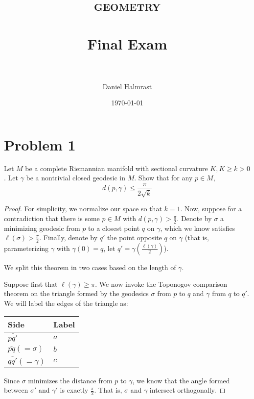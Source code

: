 \documentclass[fontsize=11pt]{scrartcl} %
\title{	
\normalfont \normalsize 
\textsc{geometry} \\ [25pt] %
\horrule{0.5pt} \\[0.4cm] %
\huge Final Exam \\ %
\horrule{2pt} \\[0.5cm] %
}
\author{Daniel Halmrast} %
\date{\normalsize\today} %
\numberwithin{equation}{section} %
\numberwithin{figure}{section} %
\numberwithin{table}{section} %
\begin{document}
\maketitle %

\section*{Problem 1}
Let $M$ be a complete Riemannian manifold with sectional curvature $K, K\geq
k>0$. Let $\gamma$ be a nontrivial closed geodesic in $M$. Show that for any
$p\in M$,
\[
    d(p,\gamma)\leq \frac{\pi}{2\sqrt{k}}
\]

\begin{proof}
    For simplicity, we normalize our space so that $k=1$. Now, suppose for a
    contradiction that there is some $p\in M$ with
    $d(p,\gamma)>\frac{\pi}{2}$. Denote by $\sigma$ a minimizing geodesic from
    $p$ to a closest point $q$ on $\gamma$, which we know satisfies
    $\ell(\sigma)>\frac{\pi}{2}$. Finally, denote by $q'$ the point opposite $q$
    on $\gamma$ (that is, parameterizing $\gamma$ with $\gamma(0)=q$, let $q' =
    \gamma(\frac{\ell(\gamma)}{2})$).

    We split this theorem in two cases based on the length of $\gamma$.

    Suppose first that $\ell(\gamma)\geq \pi$. We now invoke the Toponogov
    comparison theorem on the triangle formed by the geodesics $\sigma$ from $p$
    to $q$ and $\gamma$ from $q$ to $q'$. We will label the edges of the
    triangle as:
    \begin{center}
        \begin{tabular}{l|l}
            Side & Label\\
            \hline
            $\overline{p q'}$ & $a$\\
            $\overline{p q} (=\sigma)$ & $b$\\
            $\overline{q q'}(=\gamma)$ & $c$
        \end{tabular}
    \end{center}

    Since $\sigma$ minimizes the distance from $p$ to $\gamma$, we know that the
    angle formed between $\sigma'$ and $\gamma'$ is exactly
    $\frac{\pi}{2}$. That is, $\sigma$ and $\gamma$ intersect orthogonally.


\end{proof}
\end{document}

